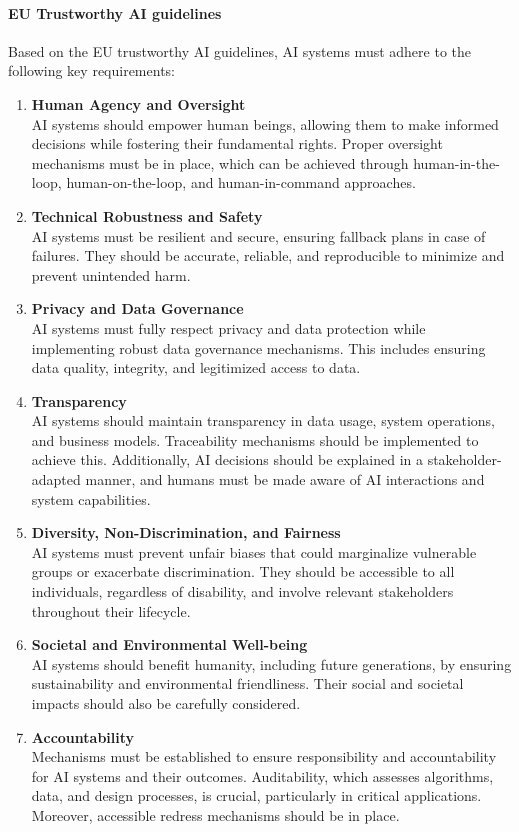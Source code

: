 \paragraph{EU Trustworthy AI guidelines\\}
Based on the EU trustworthy AI guidelines, AI systems must adhere to the following key requirements:

\begin{enumerate}
  \item \textbf{Human Agency and Oversight}\\
  AI systems should empower human beings, allowing them to make informed decisions while fostering their fundamental rights. Proper oversight mechanisms must be in place, which can be achieved through human-in-the-loop, human-on-the-loop, and human-in-command approaches.
  
  \item \textbf{Technical Robustness and Safety}\\
  AI systems must be resilient and secure, ensuring fallback plans in case of failures. They should be accurate, reliable, and reproducible to minimize and prevent unintended harm.
  
  \item \textbf{Privacy and Data Governance}\\
  AI systems must fully respect privacy and data protection while implementing robust data governance mechanisms. This includes ensuring data quality, integrity, and legitimized access to data.
  
  \item \textbf{Transparency}\\
  AI systems should maintain transparency in data usage, system operations, and business models. Traceability mechanisms should be implemented to achieve this. Additionally, AI decisions should be explained in a stakeholder-adapted manner, and humans must be made aware of AI interactions and system capabilities.
  
  \item \textbf{Diversity, Non-Discrimination, and Fairness}\\
  AI systems must prevent unfair biases that could marginalize vulnerable groups or exacerbate discrimination. They should be accessible to all individuals, regardless of disability, and involve relevant stakeholders throughout their lifecycle.
  
  \item \textbf{Societal and Environmental Well-being}\\
  AI systems should benefit humanity, including future generations, by ensuring sustainability and environmental friendliness. Their social and societal impacts should also be carefully considered.
  
  \item \textbf{Accountability}\\
  Mechanisms must be established to ensure responsibility and accountability for AI systems and their outcomes. Auditability, which assesses algorithms, data, and design processes, is crucial, particularly in critical applications. Moreover, accessible redress mechanisms should be in place.
\end{enumerate}

